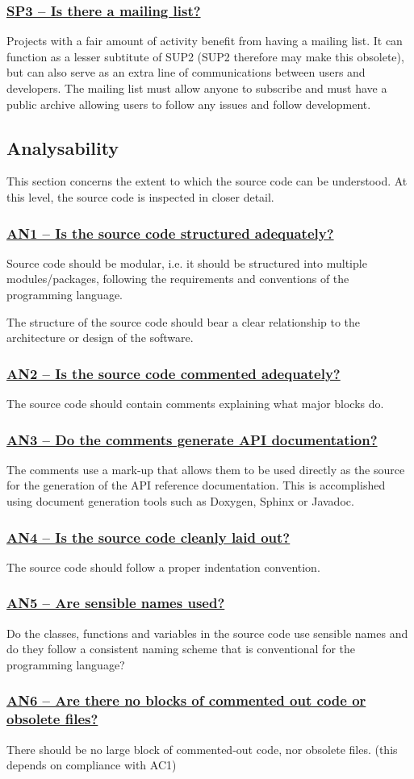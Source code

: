 \documentclass[a4paper,11pt]{article}
\newcommand{\criterion}[1]{\subsubsection*{\underline{#1}}}
\begin{document}
\criterion{SP3 -- Is there a mailing list?}

Projects with a fair amount of activity benefit from having a mailing list. It
can function as a lesser subtitute of SUP2 (SUP2 therefore may make this
obsolete), but can also serve as an extra line of communications between users
and developers. The mailing list must allow anyone to subscribe and must have a
public archive allowing users to follow any issues and follow development.

\subsection{Analysability}

This section concerns the extent to which the source code can be understood. At
this level, the source code is inspected in closer detail.

\criterion{AN1 -- Is the source code structured adequately?}

Source code should be modular, i.e. it should be structured into multiple
modules/packages, following the requirements and conventions of the programming
language. 

The structure of the source code should bear a clear relationship to the
architecture or design of the software.

\criterion{AN2 -- Is the source code commented adequately?}

The source code should contain comments explaining what major blocks do.

\criterion{AN3 -- Do the comments generate API documentation?}

The comments use a mark-up that allows them to be used directly as the
source for the generation of the API reference documentation. This is
accomplished using document generation tools such as Doxygen, Sphinx or
Javadoc.

\criterion{AN4 -- Is the source code cleanly laid out?}

The source code should follow a proper indentation convention. 

\criterion{AN5 -- Are sensible names used?}

Do the classes, functions and variables in the source code use sensible names
and do they follow a consistent naming scheme that is conventional for the
programming language?

\criterion{AN6 -- Are there no blocks of commented out code or obsolete files?}

There should be no large block of commented-out code, nor obsolete files.
(this depends on compliance with AC1)
\end{document}
